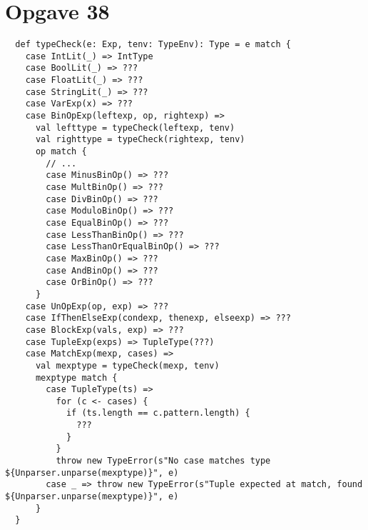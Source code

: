 \documentclass[a4paper, 10pt]{article}
\begin{document}
\section*{Opgave 38}
\begin{lstlisting}
  def typeCheck(e: Exp, tenv: TypeEnv): Type = e match {
    case IntLit(_) => IntType
    case BoolLit(_) => ???
    case FloatLit(_) => ???
    case StringLit(_) => ???
    case VarExp(x) => ???
    case BinOpExp(leftexp, op, rightexp) =>
      val lefttype = typeCheck(leftexp, tenv)
      val righttype = typeCheck(rightexp, tenv)
      op match {
        // ...
        case MinusBinOp() => ???
        case MultBinOp() => ???
        case DivBinOp() => ???
        case ModuloBinOp() => ???
        case EqualBinOp() => ???
        case LessThanBinOp() => ???
        case LessThanOrEqualBinOp() => ???
        case MaxBinOp() => ???
        case AndBinOp() => ???
        case OrBinOp() => ???
      }
    case UnOpExp(op, exp) => ???
    case IfThenElseExp(condexp, thenexp, elseexp) => ???
    case BlockExp(vals, exp) => ???
    case TupleExp(exps) => TupleType(???)
    case MatchExp(mexp, cases) =>
      val mexptype = typeCheck(mexp, tenv)
      mexptype match {
        case TupleType(ts) =>
          for (c <- cases) {
            if (ts.length == c.pattern.length) {
              ???
            }
          }
          throw new TypeError(s"No case matches type ${Unparser.unparse(mexptype)}", e)
        case _ => throw new TypeError(s"Tuple expected at match, found ${Unparser.unparse(mexptype)}", e)
      }
  }
\end{lstlisting}
\end{document}
